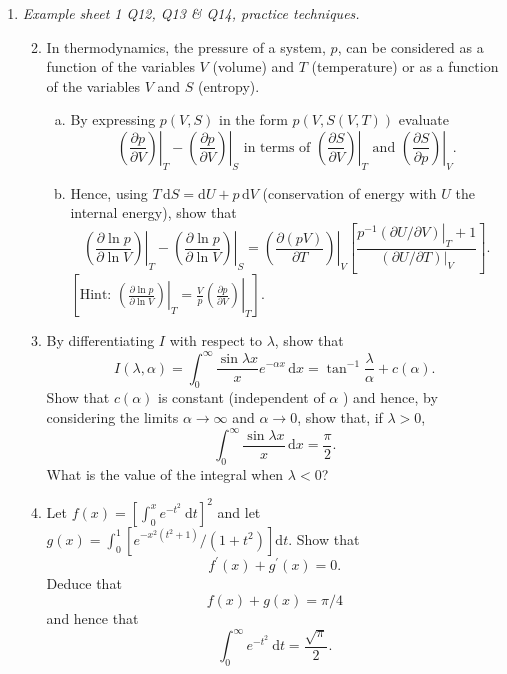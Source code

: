 \documentclass[11pt]{article}
\newlength{\qspace}
\newcounter{qnumber}
\newenvironment{question}%
 {\vspace{\qspace}
  \begin{enumerate}[\bfseries 1\quad][10]%
    \setcounter{enumi}{\value{qnumber}}%
    \item%
 }
{
  \end{enumerate}
  \filbreak
  \stepcounter{qnumber}
 }
\newenvironment{questionparts}[1][1]%
 {
  \begin{enumerate}[\bfseries (i)]%
    \setcounter{enumii}{#1}
    \addtocounter{enumii}{-1}
    \setlength{\parskip}{3pt}
 }
 {
  \end{enumerate}
 }
\begin{document}
\begin{question}\textit{Example sheet 1 Q12, Q13 \& Q14, practice techniques.}
    
    \begin{questionparts}
        \item In thermodynamics, the pressure of a system, $p$, can be considered as a function of the variables $V$ (volume) and $T$ (temperature) or as a function of the variables $V$ and $S$ (entropy).
        \begin{enumerate}[(a)]
            \item By expressing $p(V, S)$ in the form $p(V, S(V, T))$ evaluate
            \[
            \left.\left(\frac{\partial p}{\partial V}\right)\right|_{T}-\left.\left(\frac{\partial p}{\partial V}\right)\right|_{S} \text { in terms of }\left.\left(\frac{\partial S}{\partial V}\right)\right|_{T} \text { and }\left.\left(\frac{\partial S}{\partial p}\right)\right|_{V} .
            \]
            \item Hence, using $T\,\mathrm d S=\mathrm d U+p \,\mathrm d V$ (conservation of energy with $U$ the internal energy), show that
            \[
            \left.\left(\frac{\partial \ln p}{\partial \ln V}\right)\right|_{T}-\left.\left(\frac{\partial \ln p}{\partial \ln V}\right)\right|_{S}=\left.\left(\frac{\partial(p V)}{\partial T}\right)\right|_{V}\left[\frac{\left.p^{-1}(\partial U / \partial V)\right|_{T}+1}{\left.(\partial U / \partial T)\right|_{V}}\right] .
            \]
            $\left[\text{Hint: }\left.\left.\left(\frac{\partial \ln p}{\partial \ln V}\right)\right|_{T}=\frac{V}{p}\left(\frac{\partial p}{\partial V}\right)\right|_{T}\right]$.
        \end{enumerate}
        \item By differentiating $I$ with respect to $\lambda$, show that
        \[
        I(\lambda, \alpha)=\int_{0}^{\infty} \frac{\sin \lambda x}{x} e^{-\alpha x} \,\mathrm d x=\tan ^{-1} \frac{\lambda}{\alpha}+c(\alpha).
        \]
        Show that $c(\alpha)$ is constant (independent of $\alpha$ ) and hence, by considering the limits $\alpha \rightarrow \infty$ and $\alpha \rightarrow 0$, show that, if $\lambda>0$,
        \[
        \int_{0}^{\infty} \frac{\sin \lambda x}{x} \,\mathrm d x=\frac{\pi}{2}.
        \]
        What is the value of the integral when $\lambda<0$?
        \item Let $f(x)=\left[\int_{0}^{x} e^{-t^{2}} \mathrm{~d} t\right]^{2}$ and let $g(x)=\int_{0}^{1}\left[e^{-x^{2}\left(t^{2}+1\right)} /\left(1+t^{2}\right)\right] \mathrm{d} t$.
        Show that
        \[
        f^{\prime}(x)+g^{\prime}(x)=0 .
        \]
        Deduce that
        \[
        f(x)+g(x)=\pi / 4
        \]
        and hence that
        \[
        \int_{0}^{\infty} e^{-t^{2}} \mathrm{~d} t=\frac{\sqrt{\pi}}{2}.
        \]
    \end{questionparts}
\end{question}
\end{document}
